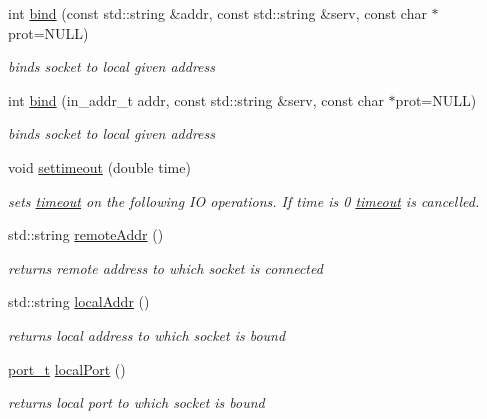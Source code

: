 \begin{CompactItemize}
int \hyperlink{classsocketpp_1_1BaseSocket_4775f13f8e1cceaaed40106162b2149f}{bind} (const std::string \&addr, const std::string \&serv, const char $\ast$prot=NULL)
\begin{CompactList}\small\item\em binds socket to local given address \item\end{CompactList}\item 
int \hyperlink{classsocketpp_1_1BaseSocket_aab800bcb5ee48cd4410ae2b9ed83e23}{bind} (in\_\-addr\_\-t addr, const std::string \&serv, const char $\ast$prot=NULL)
\begin{CompactList}\small\item\em binds socket to local given address \item\end{CompactList}\item 
void \hyperlink{classsocketpp_1_1BaseSocket_0804d148470fd742cda495d3533b25c6}{settimeout} (double time)
\begin{CompactList}\small\item\em sets \hyperlink{classsocketpp_1_1timeout}{timeout} on the following IO operations. If time is 0 \hyperlink{classsocketpp_1_1timeout}{timeout} is cancelled. \item\end{CompactList}\item 
std::string \hyperlink{classsocketpp_1_1BaseSocket_483c6186ae60d0c399983e14f55af600}{remoteAddr} ()
\begin{CompactList}\small\item\em returns remote address to which socket is connected \item\end{CompactList}\item 
std::string \hyperlink{classsocketpp_1_1BaseSocket_0caed2e7d3f0e4db7d4c1aa3aba52caf}{localAddr} ()
\begin{CompactList}\small\item\em returns local address to which socket is bound \item\end{CompactList}\item 
\hyperlink{namespacesocketpp_5517ef80f249b891a2ba64b95fc1e723}{port\_\-t} \hyperlink{classsocketpp_1_1BaseSocket_d4a2c0e4932436ef61f911514385d16c}{localPort} ()
\begin{CompactList}\small\item\em returns local port to which socket is bound \item\end{CompactList}\item 

\end{CompactItemize}
